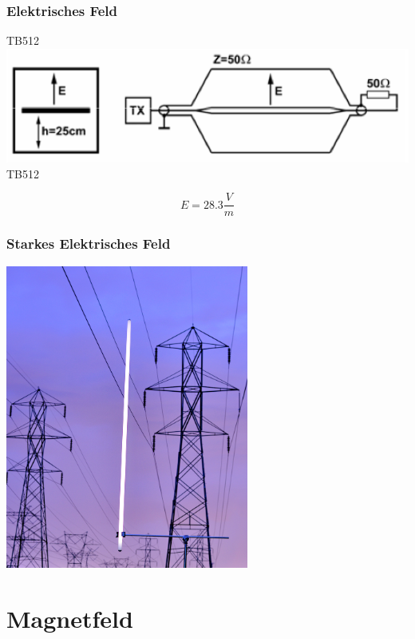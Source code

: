 \begin{frame}
    \frametitle{Elektrisches Feld}
    \begin{center}
\begin{block}{TB512}
        \includegraphics[width=1\textwidth]{a08/TB512.png}\\
        \tiny TB512 \hyperlink{refs}{\cite{bna}}
    
    \large $$E = 28.3 \frac{V}{m}$$
\end{block}
    \end{center}
\end{frame}

\begin{frame}
    \frametitle{Starkes Elektrisches Feld}
    \begin{center}
        \includegraphics[width=0.6\textwidth]{a08/Fluorescent_tube_under_electric_line.jpg}
        \tiny \hyperlink{refs}{\cite{wm}} \\[1em] \large
    \end{center}
\end{frame}

\section*{Magnetfeld}


